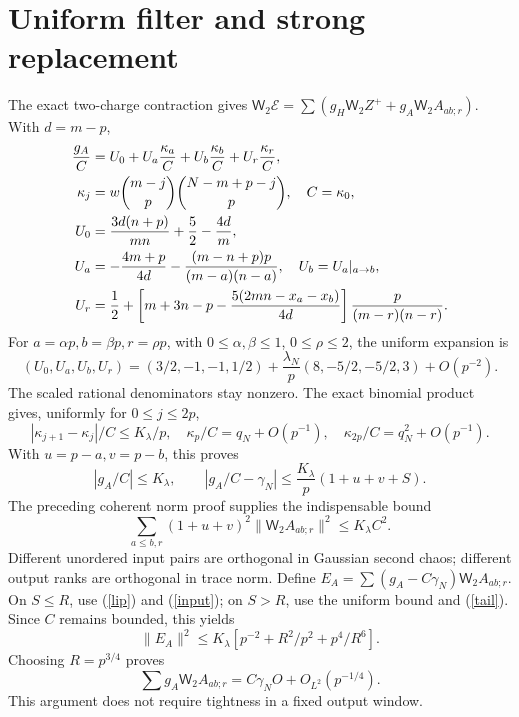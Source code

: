 \documentclass[11pt,a4paper]{article}
\newcommand{\W}{\mathsf W_2}
\newcommand{\core}{\mathcal E}
\begin{document}
\newpage
\section{Uniform filter and strong replacement}
The exact two-charge contraction gives
$\W\core=\sum(g_H\W Z^++g_A\W A_{ab;r})$. With $d=m-p$,
\begin{align}
 \frac{g_A}{C}&=U_0+U_a\frac{\kappa_a}{C}
                   +U_b\frac{\kappa_b}{C}+U_r\frac{\kappa_r}{C},\\
 \kappa_j&=w\binom{m-j}{p}\binom{N-m+p-j}{p},\quad C=\kappa_0,\notag\\
 U_0&=\frac{3d(n+p)}{mn}+\frac52-\frac{4d}{m},\notag\\
 U_a&=-\frac{4m+p}{4d}-\frac{(m-n+p)p}{(m-a)(n-a)},\quad U_b=U_a|_{a\to b},\notag\\
 U_r&=\frac12+\left[m+3n-p-\frac{5(2mn-x_a-x_b)}{4d}\right]
                    \frac{p}{(m-r)(n-r)}.\notag
\end{align}
For $a=\alpha p,b=\beta p,r=\rho p$, with
$0\leq\alpha,\beta\leq1$, $0\leq\rho\leq2$, the uniform expansion is
\begin{equation}
 (U_0,U_a,U_b,U_r)=
 (3/2,-1,-1,1/2)+\frac{\lambda_N}{p}(8,-5/2,-5/2,3)+O(p^{-2}).
\end{equation}
The scaled rational denominators stay nonzero. The exact binomial
product gives, uniformly for $0\leq j\leq2p$,
\begin{equation}
 |\kappa_{j+1}-\kappa_j|/C\leq K_\lambda/p,\quad
 \kappa_p/C=q_N+O(p^{-1}),\quad\kappa_{2p}/C=q_N^2+O(p^{-1}).
\end{equation}
With $u=p-a,v=p-b$, this proves
\begin{equation}
 |g_A/C|\leq K_\lambda,\qquad
 |g_A/C-\gamma_N|\leq\frac{K_\lambda}{p}(1+u+v+S).\label{lip}
\end{equation}
The preceding coherent norm proof supplies the indispensable bound
\begin{equation}
 \sum_{a\leq b,r}(1+u+v)^2\|\W A_{ab;r}\|^2\leq K_\lambda C^2.\label{input}
\end{equation}
Different unordered input pairs are orthogonal in Gaussian second
chaos; different output ranks are orthogonal in trace norm. Define
$E_A=\sum(g_A-C\gamma_N)\W A_{ab;r}$. On $S\leq R$, use
(\ref{lip}) and (\ref{input}); on $S>R$, use the uniform bound and
(\ref{tail}). Since $C$ remains bounded, this yields
\begin{equation}
 \|E_A\|^2\leq K_\lambda[p^{-2}+R^2/p^2+p^4/R^6].
\end{equation}
Choosing $R=p^{3/4}$ proves
\begin{equation}
 \boxed{\ \sum g_A\W A_{ab;r}=C\gamma_N O+O_{L^2}(p^{-1/4}).\ }\label{strong}
\end{equation}
This argument does not require tightness in a fixed output window.
\end{document}
